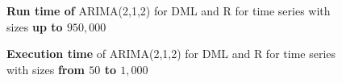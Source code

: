 \begin{figure}[ht]
	\centering
	\caption{\textbf{Run time of} ARIMA(2,1,2) for DML and R for time series with sizes \textbf{up to $950,000$} }
    \label{apx-fig:arima212-runtime-scatter-all}
\end{figure}

\begin{figure}[ht]
	\centering
	\caption{\textbf{Execution time} of ARIMA(2,1,2) for DML and R for time series with sizes \textbf{from $50$ to $1,000$} }
    \label{apx-fig:arima212-exectime-scatter-all_small}
\end{figure}

